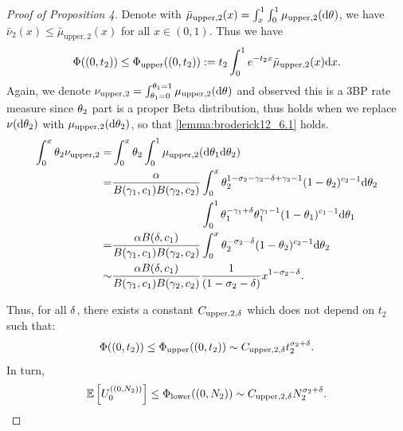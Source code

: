 \begin{proof}[Proof of Proposition 4]
Denote with $\bar\mu_{\mathrm{upper}, 2}(x)=\int_{x}^1\int_{0}^1 \mu_{\mathrm{upper}, 2}(\de\vecvariantfreq{}) $, we have $\bar\nu_2(x)\le \bar\mu_{\mathrm{upper}, 2} (x)$ for all $x \in (0,1)$. %
Thus we have
\begin{align*}
    \Phi((0, t_2))\le \Phi_{\mathrm{upper}}((0, t_2)):= t_2\int_{0}^1 e^{-t_2x} \bar\mu_{\mathrm{upper}, 2}(x)\mathrm{d} x.
\end{align*}
Again, we denote $\levync_{\mathrm{upper}, 2}=\int_{\variantfreqperpop{1}=0}^{\variantfreqperpop{1}=1} \mu_{\mathrm{upper}, 2}(\de\vecvariantfreq{})$ and observed this is a 3BP rate measure since $\theta_{2}$ part is a proper Beta distribution, thus  holds when we replace $\nu(\mathrm{d} \theta_{2})$ with $\mu_{\mathrm{upper}, 2}(\mathrm{d}\theta_{2})$, so that  \cref{lemma:broderick12_6.1} holds.
\begin{align*}
     \int_{0}^{x} \theta_{2} \nu_{\mathrm{upper}, 2} = &\int_{0}^{x} \theta_{2} \int_{0}^1 \mu_{\mathrm{upper}, 2}(\mathrm{d}\theta_{1}\mathrm{d} \theta_{2})  \\
    =&\frac{\alpha}{B(\gamma_{1}, c_{1})B(\gamma_{2}, c_{2})}\int_{0}^x \theta_{2}^{1-\sigma_{2}-\gamma_{2}-\delta+\gamma_{2}-1} (1-\theta_{2})^{c_{2}-1}\mathrm{d}\theta_{2} \\
 & \qquad\qquad \qquad \qquad \int_0^1 \theta_{1}^{-\gamma_{1}+\delta}\theta_{1}^{\gamma_{1}-1}(1-\theta_{1})^{c_{1}-1} \mathrm{d}\theta_{1}\\
    =&\frac{\alpha B(\delta, c_{1})}{B(\gamma_{1}, c_{1})B(\gamma_{2}, c_{2})}\int_{0}^x \theta_{2}^{-\sigma_{2}-\delta} (1-\theta_{2})^{c_{2}-1}\mathrm{d}\theta_{2} \\
    \sim& \frac{\alpha B(\delta, c_{1})}{B(\gamma_{1}, c_{1})B(\gamma_{2}, c_{2})} \frac{1}{(1-\sigma_{2}-\delta)} x^{1-\sigma_{2}-\delta}.
\end{align*}

Thus, for all $\delta$, there exists a constant $C_{\mathrm{upper},2,\delta}$ which does not depend on $t_2$ such that:
\begin{align*}
    \Phi((0, t_2))\le \Phi_{\mathrm{upper}}((0,t_2))\sim C_{\mathrm{upper},2,\delta} t_2^{\sigma_{2}+\delta}.
\end{align*}
In turn,
\begin{equation}
    \E\left[\news{\zerovec}{(0,\samplesize{2})} \right] \le \lowerbound((0,\samplesize{2}))\sim \constantupper{2} \samplesize{2}^{\rate{2}+\smallpositive}.
    \label{eq:upperbound_pop2}
\end{equation}




\end{proof}

